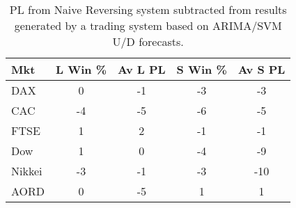\begin{table}[ht]
\centering
\caption[ARIMA/SVM U/D system results minus Naive Reversing results]{PL from Naive Reversing system subtracted from results generated by a trading system based on ARIMA/SVM U/D forecasts.} 
\label{tab:chp_ts:pUD_CAT_arima_svm_sys_diff}
\begin{tabular}{lcccc}
  \toprule Mkt & L Win \% & Av L PL & S Win \% & Av S PL \\ 
  \midrule DAX & 0 & -1 & -3 & -3 \\ 
  CAC & -4 & -5 & -6 & -5 \\ 
  FTSE & 1 & 2 & -1 & -1 \\ 
  Dow & 1 & 0 & -4 & -9 \\ 
  Nikkei & -3 & -1 & -3 & -10 \\ 
  AORD & 0 & -5 & 1 & 1 \\ 
   \bottomrule \end{tabular}
\end{table}
